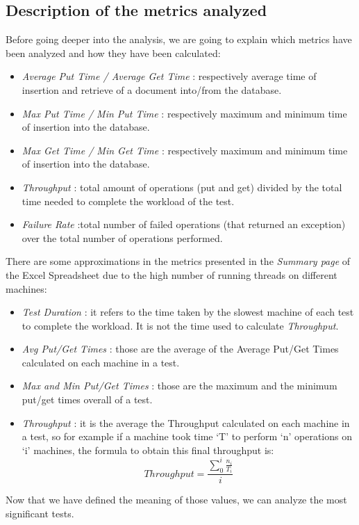 \subsection{Description of the metrics analyzed}
Before going deeper into the analysis, we are going to explain which metrics have been analyzed and how they have been calculated:
\begin{itemize}
	\item \textit{Average Put Time / Average Get Time} : respectively average time of insertion and retrieve of a document into/from the database.
	\item \textit{Max Put Time / Min Put Time} : respectively maximum and minimum time of insertion into the database.
	\item \textit{Max Get Time / Min Get Time} : respectively maximum and minimum time of insertion into the database.
	\item \textit{Throughput} : total amount of operations (put and get) divided by the total time needed to complete the workload of the test.
	\item \textit{Failure Rate} :total number of failed operations (that returned an exception) over the total number of operations performed.
\end{itemize}
There are some approximations in the metrics presented in the \textit{Summary page} of the Excel Spreadsheet due to the high number of running threads on different machines:
\begin{itemize}
	\item \textit{Test Duration} : it refers to the time taken by the slowest machine of each test to complete the workload. It is not the time used to calculate \textit{Throughput}.
	\item \textit{Avg Put/Get Times} : those are the average of the Average Put/Get Times calculated on each machine in a test.
	\item \textit{Max and Min Put/Get Times} : those are the maximum and the minimum put/get times overall of a test.
	\item \textit{Throughput} : it is the average the Throughput calculated on each machine in a test, so for example if a machine took time ‘T’ to perform ‘n’ operations on ‘i’ machines, the formula to obtain this final throughput is: 
\[Throughput = \frac{\sum_{0}^{i}\frac{n_{i}}{T_{i}}}{i}\]

\end{itemize}
Now that we have defined the meaning of those values, we can analyze the most significant tests.
